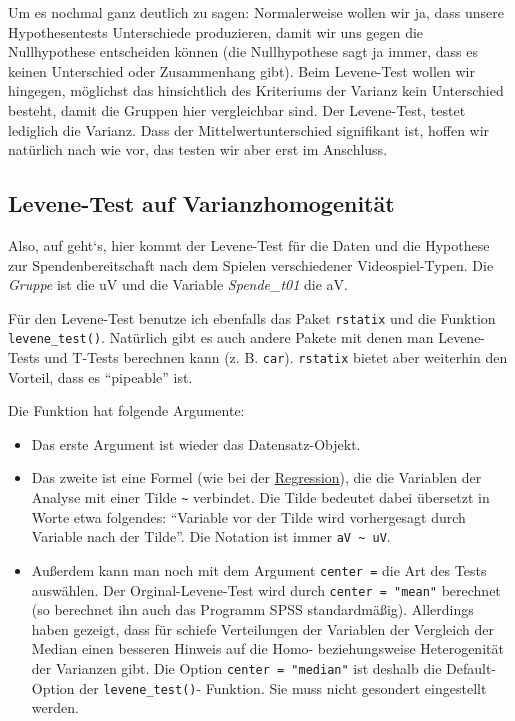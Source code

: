 \documentclass[
]{book}
\begin{document}
Um es nochmal ganz deutlich zu sagen: Normalerweise wollen wir ja, dass unsere Hypothesentests Unterschiede produzieren, damit wir uns gegen die Nullhypothese entscheiden können (die Nullhypothese sagt ja immer, dass es keinen Unterschied oder Zusammenhang gibt). Beim Levene-Test wollen wir hingegen, möglichst das hinsichtlich des Kriteriums der Varianz kein Unterschied besteht, damit die Gruppen hier vergleichbar sind. Der Levene-Test, testet lediglich die Varianz. Dass der Mittelwertunterschied signifikant ist, hoffen wir natürlich nach wie vor, das testen wir aber erst im Anschluss.

\hypertarget{levene-test-auf-varianzhomogenituxe4t}{%
\subsection{Levene-Test auf Varianzhomogenität}\label{levene-test-auf-varianzhomogenituxe4t}}

Also, auf geht`s, hier kommt der Levene-Test für die Daten und die Hypothese zur Spendenbereitschaft nach dem Spielen verschiedener Videospiel-Typen. Die \emph{Gruppe} ist die uV und die Variable \emph{Spende\_t01} die aV.

Für den Levene-Test benutze ich ebenfalls das Paket \texttt{rstatix} und die Funktion \texttt{levene\_test()}. Natürlich gibt es auch andere Pakete mit denen man Levene-Tests und T-Tests berechnen kann (z. B. \texttt{car}). \texttt{rstatix} bietet aber weiterhin den Vorteil, dass es ``pipeable'' ist.

Die Funktion hat folgende Argumente:

\begin{itemize}
\item
  Das erste Argument ist wieder das Datensatz-Objekt.
\item
  Das zweite ist eine Formel (wie bei der \protect\hyperlink{regression}{Regression}), die die Variablen der Analyse mit einer Tilde \texttt{\textasciitilde{}} verbindet. Die Tilde bedeutet dabei übersetzt in Worte etwa folgendes: ``Variable vor der Tilde wird vorhergesagt durch Variable nach der Tilde''. Die Notation ist immer \texttt{aV\ \textasciitilde{}\ uV}.
\item
  Außerdem kann man noch mit dem Argument \texttt{center\ =} die Art des Tests auswählen. Der Orginal-Levene-Test wird durch \texttt{center\ =\ "mean"} berechnet (so berechnet ihn auch das Programm SPSS standardmäßig). Allerdings haben \citep{Brown_1974} gezeigt, dass für schiefe Verteilungen der Variablen der Vergleich der Median einen besseren Hinweis auf die Homo- beziehungsweise Heterogenität der Varianzen gibt. Die Option \texttt{center\ =\ "median"} ist deshalb die Default-Option der \texttt{levene\_test()}- Funktion. Sie muss nicht gesondert eingestellt werden.
\end{itemize}
\end{document}
